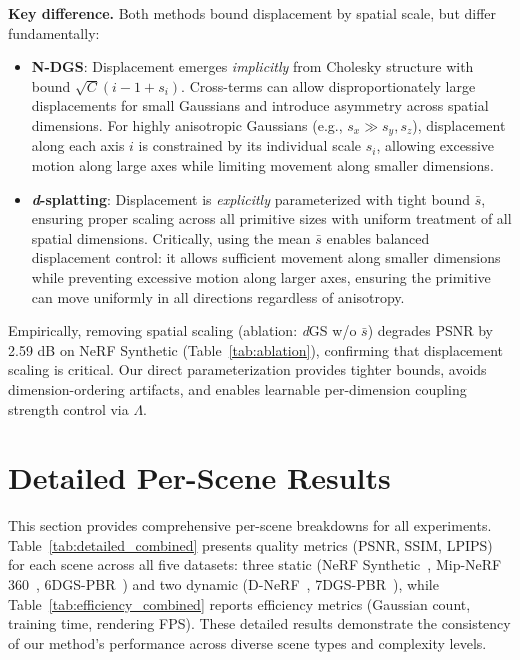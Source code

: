 \documentclass{article}
\newcommand{\dfamily}{\textit{d}-splatting\xspace}
\theoremstyle{plain}
\theoremstyle{definition}
\theoremstyle{remark}
\begin{document}
\textbf{Key difference.} Both methods bound displacement by spatial scale, but differ fundamentally:
\begin{itemize}[leftmargin=*]
\item \textbf{N-DGS}: Displacement emerges \textit{implicitly} from Cholesky structure with bound $\sqrt{C}(i-1 + s_i)$. Cross-terms can allow disproportionately large displacements for small Gaussians and introduce asymmetry across spatial dimensions. For highly anisotropic Gaussians (e.g., $s_x \gg s_y, s_z$), displacement along each axis $i$ is constrained by its individual scale $s_i$, allowing excessive motion along large axes while limiting movement along smaller dimensions.
\item \textbf{\dfamily{}}: Displacement is \textit{explicitly} parameterized with tight bound $\bar{s}$, ensuring proper scaling across all primitive sizes with uniform treatment of all spatial dimensions. Critically, using the mean $\bar{s}$ enables balanced displacement control: it allows sufficient movement along smaller dimensions while preventing excessive motion along larger axes, ensuring the primitive can move uniformly in all directions regardless of anisotropy.
\end{itemize}

Empirically, removing spatial scaling (ablation: \textit{d}GS w/o $\bar{s}$) degrades PSNR by 2.59 dB on NeRF Synthetic (Table~\ref{tab:ablation}), confirming that displacement scaling is critical. Our direct parameterization provides tighter bounds, avoids dimension-ordering artifacts, and enables learnable per-dimension coupling strength control via $\Lambda$.


\section{Detailed Per-Scene Results}
\label{sec:detailed_results}

This section provides comprehensive per-scene breakdowns for all experiments. Table~\ref{tab:detailed_combined} presents quality metrics (PSNR, SSIM, LPIPS) for each scene across all five datasets: three static (NeRF Synthetic~\cite{mildenhall2021nerf}, Mip-NeRF 360~\cite{barron2021mipnerf}, 6DGS-PBR~\cite{gao20246dgs}) and two dynamic (D-NeRF~\cite{pumarola2020dnerfneuralradiancefields}, 7DGS-PBR~\cite{gao20257dgs}), while Table~\ref{tab:efficiency_combined} reports efficiency metrics (Gaussian count, training time, rendering FPS). These detailed results demonstrate the consistency of our method's performance across diverse scene types and complexity levels.
\end{document}
